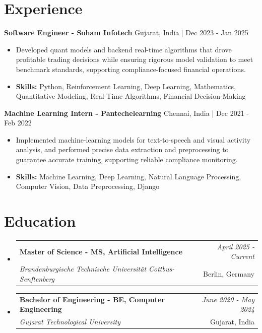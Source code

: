 \documentclass[a4paper,11pt]{article}
\makeatletter
\newcommand{\resumeSubheading}[4]{
\vspace{0.5mm}\item
    \begin{tabular*}{\linewidth}[t]{l@{\extracolsep{\fill}}r}
        \textbf{#1} & \textit{\footnotesize{#4}} \\
        \textit{\footnotesize{#3}} &  \footnotesize{#2}\\
    \end{tabular*}
    \vspace{-2.4mm}
}
\makeatother
\begin{document}
\section{\textbf{Experience}}


\vspace{1mm}
  \textbf{Software Engineer - Soham Infotech} \hfill Gujarat, India | Dec 2023 - Jan 2025
\vspace{-1.5mm} %
\begin{itemize}
  \item Developed quant models and backend real-time algorithms that drove profitable trading decisions while ensuring rigorous model validation to meet benchmark standards, supporting compliance-focused financial operations.

\vspace{-2mm}
  \item \textbf{Skills:} Python, Reinforcement Learning, Deep Learning, Mathematics, Quantitative Modeling, Real-Time Algorithms, Financial Decision-Making
\end{itemize}

\vspace{1mm}
  \textbf{Machine Learning Intern - Pantechelearning} \hfill Chennai, India | Dec 2021 - Feb 2022
\vspace{-1.5mm} %
\begin{itemize}
  \item Implemented machine-learning models for text-to-speech and visual activity analysis, and performed precise data extraction and preprocessing to guarantee accurate training, supporting reliable compliance monitoring.
\vspace{-2mm}
  \item \textbf{Skills:} Machine Learning, Deep Learning, Natural Language Processing, Computer Vision, Data Preprocessing, Django
\end{itemize}\section{\textbf{Education}}
\vspace{-0.4mm}

\begin{itemize}[leftmargin=0.15in, label={}]
\resumeSubheading
{Master of Science - MS, Artificial Intelligence }{Berlin, Germany}
{Brandenburgische Technische Universität Cottbus-Senftenberg  }{April 2025 - Current}

\vspace{1.0mm} %
\resumeSubheading
{Bachelor of Engineering - BE, Computer Engineering  }{Gujarat, India}
{Gujarat Technological University }{June 2020 - May 2024}

\end{itemize}
\end{document}
